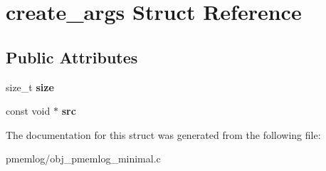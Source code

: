 \hypertarget{structcreate__args}{}\section{create\+\_\+args Struct Reference}
\label{structcreate__args}
\subsection*{Public Attributes}
\begin{DoxyCompactItemize}
\item 
\mbox{\label{structcreate__args_add64a085a263209d88311956f30ca8e0}} 
size\+\_\+t {\bfseries size}
\item 
\mbox{\label{structcreate__args_aa725c2d8040c1e66935265bf692f3fe1}} 
const void $\ast$ {\bfseries src}
\end{DoxyCompactItemize}


The documentation for this struct was generated from the following file\+:\begin{DoxyCompactItemize}
\item 
pmemlog/obj\+\_\+pmemlog\+\_\+minimal.\+c\end{DoxyCompactItemize}
